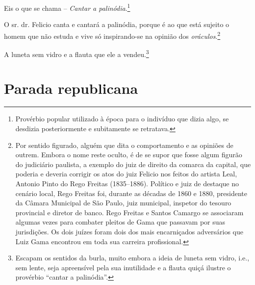 Eis o que se chama -- \emph{Cantar a palinódia}.\footnote{ Provérbio
  popular utilizado à época para o indivíduo que dizia algo, se desdizia
  posteriormente e subitamente se retratava.}

O sr. dr. Felicio canta e cantará a palinódia, porque é ao que está
sujeito o homem que não estuda e vive só inspirando-se na opinião dos
\emph{oráculos}.\footnote{ Por sentido figurado, alguém que dita o
  comportamento e as opiniões de outrem. Embora o nome reste oculto, é
  de se supor que fosse algum figurão do judiciário paulista, a exemplo
  do juiz de direito da comarca da capital, que poderia e deveria
  corrigir os atos do juiz Felicio nos feitos do artista Leal, Antonio
  Pinto do Rego Freitas (1835--1886). Político e juiz de destaque no
  cenário local, Rego Freitas foi, durante as décadas de 1860 e 1880,
  presidente da Câmara Municipal de São Paulo, juiz municipal, inspetor
  do tesouro provincial e diretor de banco. Rego Freitas e Santos
  Camargo se associaram algumas vezes para combater pleitos de Gama que
  passavam por suas jurisdições. Os dois juízes foram dois dos mais
  encarniçados adversários que Luiz Gama encontrou em toda sua carreira
  profissional.}

A luneta sem vidro e a flauta que ele a vendeu.\footnote{ Escapam os
  sentidos da burla, muito embora a ideia de luneta sem vidro, i.e., sem
  lente, seja apreensível pela sua inutilidade e a flauta quiçá ilustre
  o provérbio ``cantar a palinódia''.}

\part{Parada republicana}

